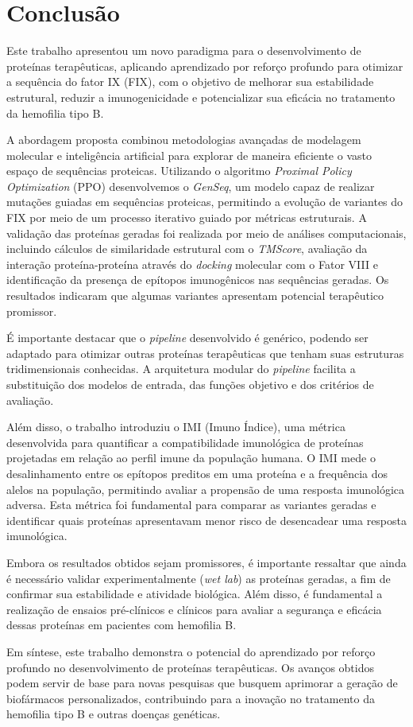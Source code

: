 \chapter{Conclusão}

Este trabalho apresentou um novo paradigma para o desenvolvimento de proteínas terapêuticas,
aplicando aprendizado por reforço profundo para otimizar a sequência do fator IX (FIX),
com o objetivo de melhorar sua estabilidade estrutural, 
reduzir a imunogenicidade e potencializar sua eficácia no tratamento da hemofilia tipo B.  


A abordagem proposta combinou metodologias avançadas de modelagem molecular e inteligência artificial 
para explorar de maneira eficiente o vasto espaço de sequências proteicas. 
Utilizando o algoritmo \textit{Proximal Policy Optimization} (PPO)
desenvolvemos o \textit{GenSeq}, um modelo capaz de realizar mutações guiadas em sequências proteicas,
permitindo a evolução de variantes do FIX por meio de um processo iterativo
guiado por métricas estruturais.
A validação das proteínas geradas foi realizada por meio de análises computacionais, 
incluindo cálculos de similaridade estrutural com o \textit{TMScore}, 
avaliação da interação proteína-proteína através do \textit{docking} molecular com o Fator VIII
e identificação da presença de epítopos imunogênicos nas sequências geradas.
Os resultados indicaram que algumas variantes apresentam potencial terapêutico promissor. 

É importante destacar que o \textit{pipeline} desenvolvido é genérico, 
podendo ser adaptado para otimizar outras proteínas terapêuticas que tenham suas estruturas tridimensionais
conhecidas. A arquitetura modular do \textit{pipeline} facilita a substituição dos modelos de entrada,
das funções objetivo e dos critérios de avaliação.

Além disso, o trabalho introduziu o IMI (Imuno Índice),
uma métrica desenvolvida para quantificar a compatibilidade imunológica de proteínas projetadas 
em relação ao perfil imune da população humana. 
O IMI mede o desalinhamento entre os epítopos 
preditos em uma proteína e a frequência dos alelos na população, 
permitindo avaliar a propensão de uma resposta imunológica adversa.
Esta métrica foi fundamental para comparar as variantes geradas e 
identificar quais proteínas apresentavam menor risco de desencadear uma resposta imunológica.

Embora os resultados obtidos sejam promissores, 
é importante ressaltar que ainda é necessário validar experimentalmente (\textit{wet lab})
as proteínas geradas, a fim de confirmar sua estabilidade e atividade biológica.
Além disso, é fundamental a realização de ensaios pré-clínicos e clínicos
para avaliar a segurança e eficácia dessas proteínas em pacientes com hemofilia B.

Em síntese, este trabalho demonstra o potencial do aprendizado por reforço profundo no desenvolvimento 
de proteínas terapêuticas. 
Os avanços obtidos podem servir de base para novas pesquisas que busquem aprimorar a 
geração de biofármacos personalizados, 
contribuindo para a inovação no tratamento da hemofilia tipo B e outras doenças genéticas.

